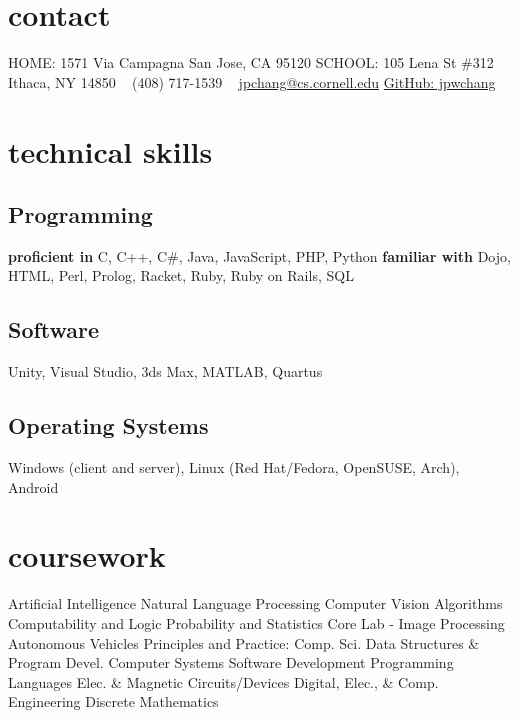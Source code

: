 \documentclass[]{friggeri-cv} %
\begin{document}


\begin{aside} %
\section{contact}
HOME:
1571 Via Campagna
San Jose, CA 95120
SCHOOL:
105 Lena St \#312
Ithaca, NY 14850
~
(408) 717-1539
~
\href{mailto:jpchang@cs.cornell.edu}{jpchang@cs.cornell.edu}
\href{https://github.com/jpwchang}{GitHub: jpwchang}
\section{technical skills}
\subsection{Programming}
\textbf{proficient in}
C, C++, C\#, Java, JavaScript, PHP, Python
\textbf{familiar with}
Dojo, HTML, Perl, Prolog, Racket, Ruby, Ruby on Rails, SQL
\subsection{Software}
Unity, Visual Studio, 3ds Max, MATLAB, Quartus
\subsection{Operating Systems}
Windows (client and server), Linux (Red Hat/Fedora, OpenSUSE, Arch), Android
\section{coursework}
Artificial Intelligence
Natural Language Processing
Computer Vision
Algorithms
Computability and Logic
Probability and Statistics
Core Lab - Image Processing
Autonomous Vehicles
Principles and Practice: Comp. Sci.
Data Structures \& Program Devel.
Computer Systems
Software Development
Programming Languages
Elec. \& Magnetic Circuits/Devices
Digital, Elec., \& Comp. Engineering
Discrete Mathematics
\end{aside}

\end{document}

